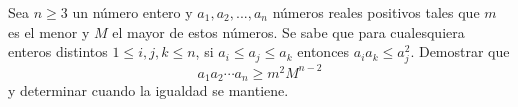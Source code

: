 Sea $n \geq 3$ un número entero y $a_1,a_2,...,a_n$ números reales positivos tales que $m$ es el menor y $M$ el mayor de estos números. Se sabe que para cualesquiera enteros distintos $1 \leq i,j,k \leq n$, si $a_i \leq a_j \leq a_k$ entonces $a_ia_k \leq a_j^2$. Demostrar que
\[ a_1a_2 \cdots a_n \geq m^2M^{n-2} \]
y determinar cuando la igualdad se mantiene.
